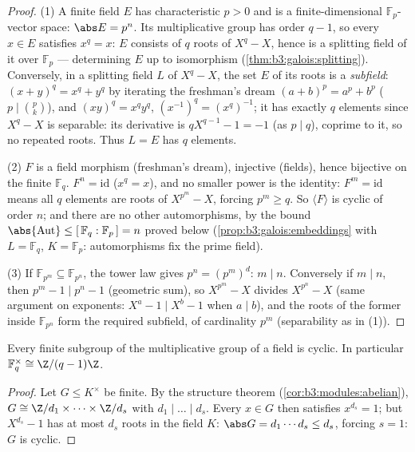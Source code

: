 \begin{proof}
(1) A finite field $E$ has characteristic $p > 0$ and is a
finite-dimensional $\mathbb F_p$-vector space: $\abs E = p^n$.
Its multiplicative group has order $q - 1$, so every $x \in E$
satisfies $x^q = x$: $E$ consists of $q$ roots of $X^q - X$,
hence is a splitting field of it over $\mathbb F_p$ ---
determining $E$ up to isomorphism
(\cref{thm:b3:galois:splitting}). Conversely, in a splitting
field $L$ of $X^q - X$, the set $E$ of its roots is a
\emph{subfield}: $(x + y)^q = x^q + y^q$ by iterating the
freshman's dream $(a+b)^p = a^p + b^p$ ($p \mid \binom pk$), and
$(xy)^q = x^qy^q$, $(x^{-1})^q = (x^q)^{-1}$; it has exactly $q$
elements since $X^q - X$ is separable: its derivative is
$qX^{q-1} - 1 = -1$ (as $p \mid q$), coprime to it, so no
repeated roots. Thus $L = E$ has $q$ elements.

(2) $F$ is a field morphism (freshman's dream), injective
(fields), hence bijective on the finite $\mathbb F_q$. $F^n =
\mathrm{id}$ ($x^q = x$), and no smaller power is the identity:
$F^m = \mathrm{id}$ means all $q$ elements are roots of
$X^{p^m} - X$, forcing $p^m \geq q$. So $\langle F\rangle$ is
cyclic of order $n$; and there are no other automorphisms, by
the bound $\abs{\operatorname{Aut}} \leq [\,\mathbb F_q :
\mathbb F_p\,] = n$ proved below
(\cref{prop:b3:galois:embeddings} with $L = \mathbb F_q$, $K =
\mathbb F_p$: automorphisms fix the prime field).

(3) If $\mathbb F_{p^m} \subseteq \mathbb F_{p^n}$, the tower law
gives $p^n = (p^m)^d$: $m \mid n$. Conversely if $m \mid n$, then
$p^m - 1 \mid p^n - 1$ (geometric sum), so $X^{p^m} - X$ divides
$X^{p^n} - X$ (same argument on exponents: $X^{a} - 1 \mid X^{b}
- 1$ when $a \mid b$), and the roots of the former inside
$\mathbb F_{p^n}$ form the required subfield, of cardinality
$p^m$ (separability as in (1)).
\end{proof}

\begin{theorem}[Cyclicity]\label{thm:b3:galois:cyclic}
Every finite subgroup of the multiplicative group of a field is
cyclic. In particular $\mathbb F_q^\times \cong
\Z/(q-1)\Z$.
\end{theorem}

\begin{proof}
Let $G \leq K^\times$ be finite. By the structure theorem
(\cref{cor:b3:modules:abelian}), $G \cong \Z/d_1 \times \dots
\times \Z/d_s$ with $d_1 \mid \dots \mid d_s$. Every $x \in G$
then satisfies $x^{d_s} = 1$; but $X^{d_s} - 1$ has at most
$d_s$ roots in the field $K$: $\abs G = d_1\cdots d_s \leq d_s$,
forcing $s = 1$: $G$ is cyclic.
\end{proof}

